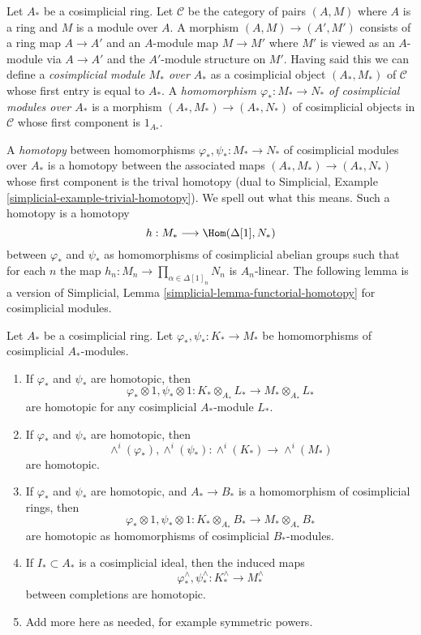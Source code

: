 \medskip\noindent
Let $A_*$ be a cosimplicial ring. Let $\mathcal{C}$ be the category
of pairs $(A, M)$ where $A$ is a ring and $M$ is a module over $A$.
A morphism $(A, M) \to (A', M')$ consists of a ring map $A \to A'$ and
an $A$-module map $M \to M'$ where $M'$ is viewed as an $A$-module
via $A \to A'$ and the $A'$-module structure on $M'$. Having said this
we can define a {\it cosimplicial module $M_*$ over $A_*$} as a cosimplicial
object $(A_*, M_*)$ of $\mathcal{C}$ whose first entry is equal to $A_*$.
A {\it homomorphism $\varphi_* : M_* \to N_*$ of cosimplicial modules over
$A_*$} is a morphism $(A_*, M_*) \to (A_*, N_*)$ of cosimplicial objects
in $\mathcal{C}$ whose first component is $1_{A_*}$.

\medskip\noindent
A {\it homotopy} between homomorphisms $\varphi_*, \psi_* : M_* \to N_*$
of cosimplicial modules over $A_*$ is a homotopy between the associated
maps $(A_*, M_*) \to (A_*, N_*)$ whose first component is the
trival homotopy (dual to
Simplicial, Example \ref{simplicial-example-trivial-homotopy}).
We spell out what this means. Such a homotopy is a homotopy
$$
h : M_* \longrightarrow \Hom(\Delta[1], N_*)
$$
between $\varphi_*$ and $\psi_*$ as homomorphisms of cosimplicial abelian
groups such that for each $n$ the map
$h_n : M_n \to \prod_{\alpha \in \Delta[1]_n} N_n$ is $A_n$-linear.
The following lemma is a version of
Simplicial, Lemma \ref{simplicial-lemma-functorial-homotopy}
for cosimplicial modules.

\begin{lemma}
\label{lemma-homotopy-tensor}
Let $A_*$ be a cosimplicial ring. Let $\varphi_*, \psi_* : K_* \to M_*$
be homomorphisms of cosimplicial $A_*$-modules.
\begin{enumerate}
\item
\label{item-tensor}
If $\varphi_*$ and $\psi_*$ are homotopic, then
$$
\varphi_* \otimes 1, \psi_* \otimes 1 :
K_* \otimes_{A_*} L_* \longrightarrow M_* \otimes_{A_*} L_*
$$
are homotopic for any cosimplicial $A_*$-module $L_*$.
\item
\label{item-wedge}
If $\varphi_*$ and $\psi_*$ are homotopic, then
$$
\wedge^i(\varphi_*), \wedge^i(\psi_*) :
\wedge^i(K_*) \longrightarrow \wedge^i(M_*)
$$
are homotopic.
\item
\label{item-base-change}
If $\varphi_*$ and $\psi_*$ are homotopic, and $A_* \to B_*$
is a homomorphism of cosimplicial rings, then
$$
\varphi_* \otimes 1, \psi_* \otimes 1 :
K_* \otimes_{A_*} B_* \longrightarrow M_* \otimes_{A_*} B_*
$$
are homotopic as homomorphisms of cosimplicial $B_*$-modules.
\item
\label{item-completion}
If $I_* \subset A_*$ is a cosimplicial ideal, then the induced
maps
$$
\varphi^\wedge_*, \psi^\wedge_* :
K_*^\wedge \longrightarrow M_*^\wedge
$$
between completions are homotopic.
\item Add more here as needed, for example symmetric powers.
\end{enumerate}
\end{lemma}

